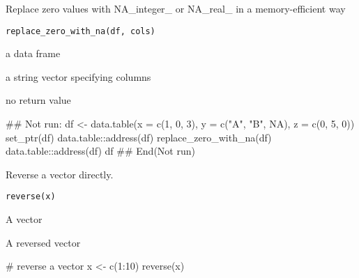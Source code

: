 \documentclass[letterpaper]{book}
\begin{document}
%
\begin{Description}
Replace zero values with NA\_integer\_ or NA\_real\_ in a memory-efficient way
\end{Description}
%
\begin{Usage}
\begin{verbatim}
replace_zero_with_na(df, cols)
\end{verbatim}
\end{Usage}
%
\begin{Arguments}
\begin{ldescription}
\item[\code{df}] a data frame

\item[\code{cols}] a string vector specifying columns
\end{ldescription}
\end{Arguments}
%
\begin{Value}
no return value
\end{Value}
%
\begin{Examples}
\begin{ExampleCode}
## Not run: 
df <- data.table(x = c(1, 0, 3), y = c("A", "B", NA), z = c(0, 5, 0))
set_ptr(df)
data.table::address(df)
replace_zero_with_na(df)
data.table::address(df)
df
## End(Not run)

\end{ExampleCode}
\end{Examples}
%
\begin{Description}
Reverse a vector directly.
\end{Description}
%
\begin{Usage}
\begin{verbatim}
reverse(x)
\end{verbatim}
\end{Usage}
%
\begin{Arguments}
\begin{ldescription}
\item[\code{x}] A vector
\end{ldescription}
\end{Arguments}
%
\begin{Value}
A reversed vector
\end{Value}
%
\begin{Examples}
\begin{ExampleCode}
# reverse a vector
x <- c(1:10)
reverse(x)

\end{ExampleCode}
\end{Examples}
\end{document}
